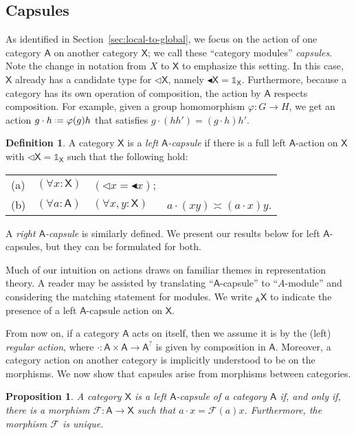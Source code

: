 \documentclass{amsart}
\newcommand{\Cat}[1]{\mathsf{#1}}
\newcommand{\cat}[1]{\Cat{#1}}
\newcommand{\acat}[1]{\mathsf{#1}}
\newcommand{\Caps}[1]{\mathsf{#1}}
\numberwithin{lstfloat}{section}
\newcommand{\tgtfunc}{\mathbin{\blacktriangleleft}}
\newcommand{\tgt}[1]{\tgtfunc #1}
\newcommand{\one}{\mathbb{1}}
\newcommand{\defeq}{\mathrel{\hstretch{.13}{=}\hspace{.2ex}{=}}}
\newcommand{\func}[1]{\mathcal{#1}}
\newcommand{\fF}{\func{F}}
\newcommand{\cA}{\cat{A}}
\newcommand{\cX}{\cat{X}}
\newcommand{\aX}{\Caps{X}}
\newtheorem{prop}[thm]{Proposition}
\theoremstyle{definition}
\newtheorem{defn}[thm]{Definition}
\theoremstyle{remark}
\numberwithin{equation}{section}
\begin{document}
\subsection{Capsules}
As identified in Section~\ref{sec:local-to-global}, we focus on the action of
one category $\cat{A}$ on another category $\cat{X}$; we call these ``category
modules'' \emph{capsules}. Note the change in notation from $X$ to $\cat{X}$ 
to emphasize this setting.
In this case, $\cat{X}$ already has a candidate type
for $\lhd \cat{X}$, namely $\tgt{\cat{X}}=\one_{\cat{X}}$. Furthermore, because
a category has its own operation of composition, the action by $\cat{A}$
respects composition.  For example, given a group homomorphism
$\varphi:G\to H$, we get an action $g\cdot h\defeq \varphi(g)h$ that satisfies
$g\cdot (hh')=(g\cdot h)h'$. 

\begin{defn}\label{def:vanilla} 
  A category $\cat{X}$ is a \emph{left $\acat{A}$-capsule} if there is a full left
  $\acat{A}$-action on $\acat{X}$ with $\lhd \acat{X} = \one_{\acat{X}}$ such
  that the following hold:\\[1ex]
  \hspace*{0.5cm}\begin{tabular}{llll}
    (a) & $(\forall x:\acat{X})$& $(\lhd x = \tgt{x})$;\\
    (b) & $(\forall a:\acat{A})$ & $(\forall x,y: \acat{X})$ & $a\cdot (xy)\asymp
    (a\cdot x)y$.
  \end{tabular}
\end{defn}
A \emph{right $\acat{A}$-capsule} is similarly defined.  
We present our results below 
for left $\acat{A}$-capsules, but they can be formulated for both.

Much of our intuition on actions draws on familiar themes in representation
theory. A reader may be assisted by translating ``$\cA$-capsule'' to
``$A$-module'' and considering the matching statement for modules.  We write
${_{\cA} {\acat{X}}}$ to indicate the presence of a left $\acat{A}$-capsule action
on $\aX$.

From now on, if a category $\acat{A}$ acts on
itself, then we assume it is by the (left) \emph{regular action}, 
where $\cdot : \acat{A}\times \acat{A} \to \acat{A}^?$ is given 
by composition in $\acat{A}$. Moreover, a
category action on another category is implicitly understood to be on the
morphisms. We now show that capsules arise from morphisms between
categories. 

\begin{prop}
  \label{prop:functors-are}
    A category $\cX$ is a left $\cA$-capsule 
    of a category $\cA$ if, and only if, there is a morphism $\fF:\cA\to \cX$ such 
    that $a\cdot x=\fF(a)x$. Furthermore, the morphism $\fF$ is unique.
\end{prop}
\end{document}

